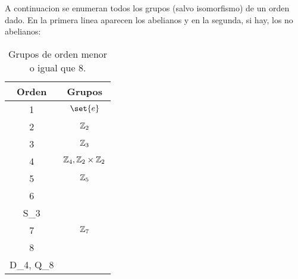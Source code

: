 A continuacion se enumeran todos los grupos (salvo isomorfismo) de un orden dado. En la primera linea aparecen los abelianos y en la segunda, si hay, los no abelianos: 
\begin{table}[H]
	\centering
	\begin{tabular}{|c|c|}
		\hline
		Orden & Grupos                                                           \\ \hline
		\hline
		1     & \(\set{e }\)                                                     \\ \hline
		2     & \(\mathbb{Z}_2 \)                                                        \\ \hline
		3     & \(\mathbb{Z}_3 \)                                                        \\ \hline
		4     & \(\mathbb{Z}_4, \mathbb{Z}_2 \times \mathbb{Z}_2 \)                                      \\ \hline
		5     & \(\mathbb{Z}_5 \)                                                        \\ \hline
		6     & \(\substack{\Z_6                                                 \\ S_3 }\)  \\ \hline
		7     & \(\mathbb{Z}_7 \)                                                        \\ \hline
		8     & \(\substack{\Z_8, \Z_2 \times \Z_4, \Z_2 \times \Z_2 \times \Z_2 \\ D_4, Q_8}\)  \\
		\hline
	\end{tabular}
	\caption{Grupos de orden menor o igual que 8.}
	\label{tab:label}
	
\end{table}